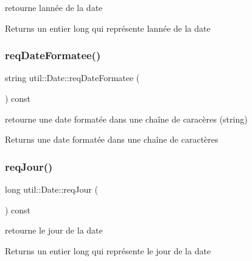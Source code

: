 retourne l\textquotesingle{}année de la date 

\begin{DoxyReturn}{Returns}
un entier long qui représente l\textquotesingle{}année de la date 
\end{DoxyReturn}
\mbox{\label{classutil_1_1Date_ad92d1e9c4d570c5f31a8e06cf2e1ae8c}} 
\subsubsection{\texorpdfstring{req\+Date\+Formatee()}{reqDateFormatee()}}
{\footnotesize\ttfamily string util\+::\+Date\+::req\+Date\+Formatee (\begin{DoxyParamCaption}{ }\end{DoxyParamCaption}) const}



retourne une date formatée dans une chaîne de caracères (string) 

\begin{DoxyReturn}{Returns}
une date formatée dans une chaîne de caractères 
\end{DoxyReturn}
\mbox{\label{classutil_1_1Date_aa2b8c7a6e23e9244a5bac8342484d3b8}} 
\subsubsection{\texorpdfstring{req\+Jour()}{reqJour()}}
{\footnotesize\ttfamily long util\+::\+Date\+::req\+Jour (\begin{DoxyParamCaption}{ }\end{DoxyParamCaption}) const}



retourne le jour de la date 

\begin{DoxyReturn}{Returns}
un entier long qui représente le jour de la date 
\end{DoxyReturn}
\mbox{\label{classutil_1_1Date_a9e76af410b6be9ac4ea9ab4df5797847}} 
